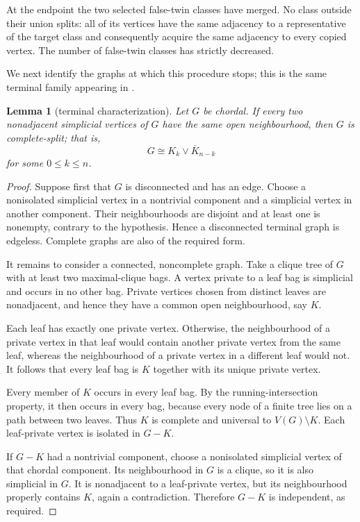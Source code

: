 \documentclass[11pt,reqno]{amsart}
\numberwithin{equation}{section}
\newtheorem{lemma}[theorem]{Lemma}
\theoremstyle{definition}
\theoremstyle{remark}
\begin{document}
At the endpoint the two selected false-twin classes have merged.  No class
outside their union splits: all of its vertices have the same adjacency to a
representative of the target class and consequently acquire the same
adjacency to every copied vertex.  The number of false-twin classes has
strictly decreased.

We next identify the graphs at which this procedure stops; this is the same
terminal family appearing in
\cite[Section~5]{TraversoPaperII2026}.

\begin{lemma}[terminal characterization]\label{lem:terminal-characterization}
Let $G$ be chordal.  If every two nonadjacent simplicial vertices of $G$ have
the same open neighbourhood, then $G$ is complete-split; that is,
\[
  G\cong K_k\vee\overline K_{n-k}
\]
for some $0\leq k\leq n$.
\end{lemma}

\begin{proof}
Suppose first that $G$ is disconnected and has an edge.  Choose a nonisolated
simplicial vertex in a nontrivial component and a simplicial vertex in another
component.  Their neighbourhoods are disjoint and at least one is nonempty,
contrary to the hypothesis.  Hence a disconnected terminal graph is edgeless.
Complete graphs are also of the required form.

It remains to consider a connected, noncomplete graph.  Take a clique tree of
$G$ with at least two maximal-clique bags.  A vertex private to a leaf bag is
simplicial and occurs in no other bag.  Private vertices chosen from distinct
leaves are nonadjacent, and hence they have a common open neighbourhood, say
$K$.

Each leaf has exactly one private vertex.  Otherwise, the neighbourhood of a
private vertex in that leaf would contain another private vertex from the
same leaf, whereas the neighbourhood of a private vertex in a different leaf
would not.  It follows that every leaf bag is $K$ together with its unique
private vertex.

Every member of $K$ occurs in every leaf bag.  By the running-intersection
property, it then occurs in every bag, because every node of a finite tree lies
on a path between two leaves.  Thus $K$ is complete and universal to
$V(G)\setminus K$.  Each leaf-private vertex is isolated in $G-K$.

If $G-K$ had a nontrivial component, choose a nonisolated simplicial vertex of
that chordal component.  Its neighbourhood in $G$ is a clique, so it is also
simplicial in $G$.  It is nonadjacent to a leaf-private vertex, but its
neighbourhood properly contains $K$, again a contradiction.  Therefore $G-K$
is independent, as required.
\end{proof}
\end{document}
